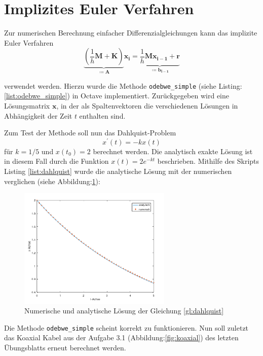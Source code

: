 \section{Implizites Euler Verfahren}\label{sec:ag4_2}

Zur numerischen Berechnung einfacher Differenzialgleichungen kann das implizite Euler Verfahren
\begin{equation}
\underbrace{
	\left( \dfrac{1}{h} \mathbf{M} + \mathbf{K} \right)
}_{\coloneqq \mathbf{A}}
\mathbf{x_i} =
\underbrace{
	\dfrac{1}{h} \mathbf{M} \mathbf{x_{i-1}} + \mathbf{r}
}_{\coloneqq \mathbf{b_{i-1}}}
\end{equation}

verwendet werden. Hierzu wurde die Methode \texttt{odebwe\_simple} (siehe Listing:\ref{list:odebwe_simple}) in Octave implementiert. Zurückgegeben wird eine Lösungsmatrix $\mathbf{x}$, in der als Spaltenvektoren die verschiedenen Lösungen in Abhängigkeit der Zeit $t$ enthalten sind.

Zum Test der Methode soll nun das Dahlquist-Problem 
\begin{equation}
	\label{gl:dahlquist}
	x^{\prime}(t) = -kx(t)
\end{equation}
für $k=1/5$ und $x(t_0) = 2$ berechnet werden. Die analytisch exakte Lösung ist in diesem Fall durch die Funktion $x(t) = 2 e^{-k t}$ beschrieben. Mithilfe des Skripts Listing \ref{list:dahlquist} wurde die analytische Lösung mit der numerischen verglichen (siehe Abbildung:\ref{fig:dahlquist}):

\begin{figure}[h]
	\centering
	\includegraphics[width=0.65\textwidth]{data/dahlquist}
	\caption{\centering Numerische und analytische Lösung der Gleichung \ref{gl:dahlquist}}
	\label{fig:dahlquist}
\end{figure}

Die Methode \texttt{odebwe\_simple} scheint korrekt zu funktionieren.
\newpage
Nun soll zuletzt das Koaxial Kabel aus der Aufgabe 3.1 (Abbildung:\ref{fig:koaxial}) des letzten Übungsblatts erneut berechnet werden. 

